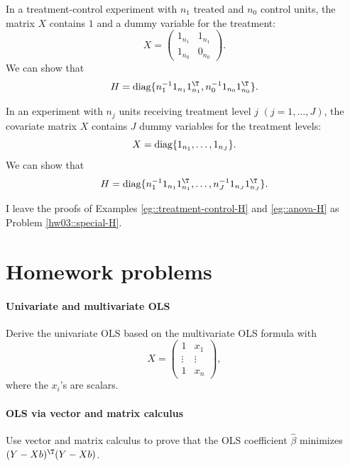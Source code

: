 \begin{example}
\label{eg::treatment-control-H}
In a treatment-control experiment with $n_1$ treated and $n_0$ control units, the matrix $X$ contains $1$ and a dummy variable for the treatment:
$$
X = \begin{pmatrix}
1_{n_1}& 1_{n_1}\\
1_{n_0}& 0_{n_0} 
\end{pmatrix}.
$$
We can show that 
$$
H = \textup{diag}\{ n_1^{-1} 1_{n_1} 1_{n_1}^{\T} , n_0^{-1} 1_{n_0} 1_{n_0}^{\T} \}.
$$
\end{example}


\begin{example}
\label{eg::anova-H}
In an experiment with $n_j$ units receiving treatment level $j$ $(j=1,\ldots, J)$, the covariate matrix $X$ contains $J$ dummy variables for the treatment levels:
$$
X =  \textup{diag}\{ 1_{n_1}, \ldots, 1_{n_J} \} .
$$
We can show that 
$$
H = \textup{diag}\{ n_1^{-1} 1_{n_1} 1_{n_1}^{\T} , \ldots, n_J^{-1} 1_{n_J} 1_{n_J}^{\T} \}.
$$
\end{example}


 
I leave the proofs of Examples \ref{eg::treatment-control-H} and \ref{eg::anova-H} as Problem \ref{hw03::special-H}. 





\section{Homework problems}

\paragraph{Univariate and multivariate OLS}

Derive the univariate OLS based on the multivariate OLS formula with
$$
X = \begin{pmatrix}
1& x_1 \\
\vdots & \vdots \\
1 & x_n
\end{pmatrix}, 
$$
where the $x_i$'s are scalars. 


\paragraph{OLS via vector and matrix calculus}

Use vector and matrix calculus to prove that the OLS coefficient $\hat\beta$ minimizes
$(Y-Xb)^{\T}(Y-Xb)$.


